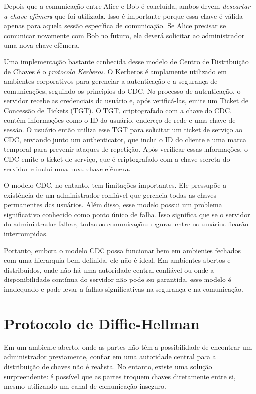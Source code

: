Depois que a comunicação entre Alice e Bob é concluída, ambos devem {\em descartar a chave efêmera} que foi utilizada.
Isso é importante porque essa chave é válida apenas para aquela sessão específica de comunicação.
Se Alice precisar se comunicar novamente com Bob no futuro, ela deverá solicitar ao administrador uma nova chave efêmera.


Uma implementação bastante conhecida desse modelo de Centro de Distribuição de Chaves é o {\em protocolo Kerberos}.
O Kerberos é amplamente utilizado em ambientes corporativos para gerenciar a autenticação e a segurança de comunicações, seguindo os princípios do CDC.
No processo de autenticação, o servidor recebe as credenciais do usuário e, após verificá-las, emite um Ticket de Concessão de Tickets (TGT).
O TGT, criptografado com a chave do CDC, contém informações como o ID do usuário, endereço de rede e uma chave de sessão.
O usuário então utiliza esse TGT para solicitar um ticket de serviço ao CDC, enviando junto um authenticator, que inclui o ID do cliente e uma marca temporal para prevenir ataques de repetição.
Após verificar essas informações, o CDC emite o ticket de serviço, que é criptografado com a chave secreta do servidor e inclui uma nova chave efêmera.

O modelo CDC, no entanto, tem limitações importantes.
Ele pressupõe a existência de um administrador confiável que gerencia todas as chaves permanentes dos usuários.
Além disso, esse modelo possui um problema significativo conhecido como ponto único de falha.
Isso significa que se o servidor do administrador falhar, todas as comunicações seguras entre os usuários ficarão interrompidas.

Portanto, embora o modelo CDC possa funcionar bem em ambientes fechados com uma hierarquia bem definida, ele não é ideal.
Em ambientes abertos e distribuídos, onde não há uma autoridade central confiável ou onde a disponibilidade contínua do servidor não pode ser garantida, esse modelo é inadequado e pode levar a falhas significativas na segurança e na comunicação.

\section{Protocolo de Diffie-Hellman}
\label{sec:diffie-hellman}


Em um ambiente aberto, onde as partes não têm a possibilidade de encontrar um administrador previamente, confiar em uma autoridade central para a distribuição de chaves não é realista.
No entanto, existe uma solução surpreendente:
é possível que as partes troquem chaves diretamente entre si, mesmo utilizando um canal de comunicação inseguro.

